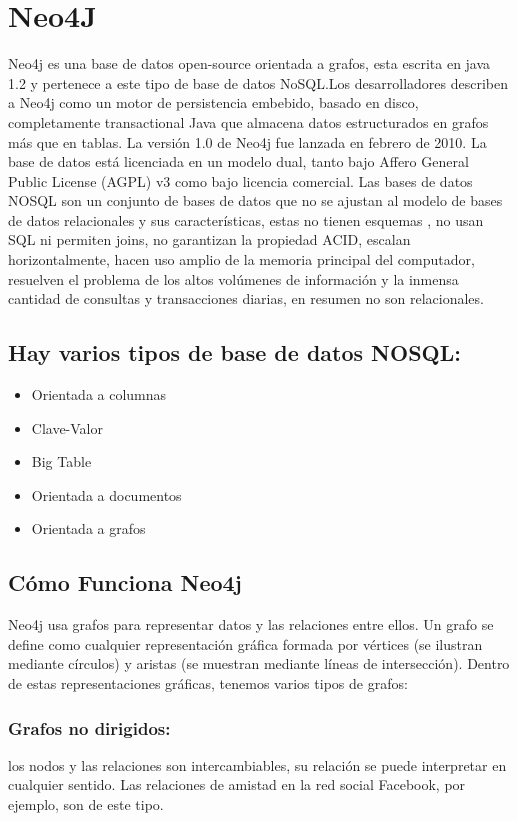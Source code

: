 \section{Neo4J}
Neo4j es una base de datos open-source orientada a grafos, esta escrita en java 1.2 y pertenece a este tipo de base de datos NoSQL.Los desarrolladores describen a Neo4j como un motor de persistencia embebido, basado en disco, completamente transactional Java que almacena datos estructurados en grafos más que en tablas. La versión 1.0 de Neo4j fue lanzada en febrero de 2010. La base de datos está licenciada en un modelo dual, tanto bajo Affero General Public License (AGPL) v3 como bajo licencia comercial.
Las bases de datos NOSQL son un conjunto de bases de datos que no se ajustan al modelo de bases de datos relacionales y sus características, estas no tienen esquemas  , no usan SQL ni permiten joins, no garantizan la propiedad ACID,  escalan horizontalmente, hacen uso amplio de la memoria principal del computador, resuelven el problema de los altos volúmenes de información y la inmensa cantidad de consultas y transacciones diarias, en resumen no son relacionales.
\subsection{Hay varios tipos de base de datos NOSQL:}
\begin{itemize}
	\item Orientada a columnas
	\item Clave-Valor
	\item Big Table
	\item Orientada a documentos
	\item Orientada a grafos
\end{itemize}
\subsection{Cómo Funciona Neo4j}
Neo4j usa grafos para representar datos y las relaciones entre ellos. Un grafo se define como cualquier representación gráfica formada por vértices (se ilustran mediante círculos) y aristas (se muestran mediante líneas de intersección). Dentro de estas representaciones gráficas, tenemos varios tipos de grafos:
\subsubsection{ Grafos no dirigidos:}
	 los nodos y las relaciones son intercambiables, su relación se puede interpretar en cualquier sentido. 	Las relaciones de amistad en la red social Facebook, por ejemplo, son de este tipo.
